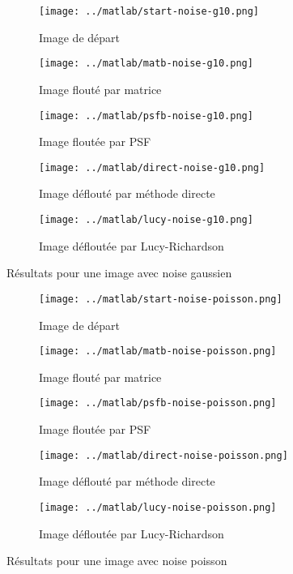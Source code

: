 \documentclass{article}
\begin{document}
\begin{figure}[!ht]
  \centering
  \begin{subfigure}[b]{0.45\textwidth}
    \texttt{[image: ../matlab/start-noise-g10.png]}
    \caption{Image de départ}
    \label{fig:start-noise-g10}
  \end{subfigure}
  \begin{subfigure}[b]{0.45\textwidth}
    \texttt{[image: ../matlab/matb-noise-g10.png]}
    \caption{Image flouté par matrice}
    \label{fig:matb-noise-g10}
  \end{subfigure}%
  \begin{subfigure}[b]{0.45\textwidth}
    \texttt{[image: ../matlab/psfb-noise-g10.png]}
    \caption{Image floutée par PSF}
    \label{fig:psfb-noise-g10_explicite_lambda}
  \end{subfigure}
  \begin{subfigure}[b]{0.45\textwidth}
    \texttt{[image: ../matlab/direct-noise-g10.png]}
    \caption{Image déflouté par méthode directe}
    \label{fig:direct-noise-g10}
  \end{subfigure}
  \begin{subfigure}[b]{0.45\textwidth}
    \texttt{[image: ../matlab/lucy-noise-g10.png]}
    \caption{Image défloutée par Lucy-Richardson}
    \label{fig:lucy-noise-g10}
  \end{subfigure}
  \caption{Résultats pour une image avec noise gaussien}
  \label{fig:noise-g10}
\end{figure}

\begin{figure}[!ht]
  \centering
  \begin{subfigure}[b]{0.45\textwidth}
    \texttt{[image: ../matlab/start-noise-poisson.png]}
    \caption{Image de départ}
    \label{fig:start-noise-poisson}
  \end{subfigure}
  \begin{subfigure}[b]{0.45\textwidth}
    \texttt{[image: ../matlab/matb-noise-poisson.png]}
    \caption{Image flouté par matrice}
    \label{fig:matb-noise-poisson}
  \end{subfigure}%
  \begin{subfigure}[b]{0.45\textwidth}
    \texttt{[image: ../matlab/psfb-noise-poisson.png]}
    \caption{Image floutée par PSF}
    \label{fig:psfb-noise-poisson_explicite_lambda}
  \end{subfigure}
  \begin{subfigure}[b]{0.45\textwidth}
    \texttt{[image: ../matlab/direct-noise-poisson.png]}
    \caption{Image déflouté par méthode directe}
    \label{fig:direct-noise-poisson}
  \end{subfigure}
  \begin{subfigure}[b]{0.45\textwidth}
    \texttt{[image: ../matlab/lucy-noise-poisson.png]}
    \caption{Image défloutée par Lucy-Richardson}
    \label{fig:lucy-noise-poisson}
  \end{subfigure}
  \caption{Résultats pour une image avec noise poisson}
  \label{fig:noise-poisson}
\end{figure}



\end{document}
